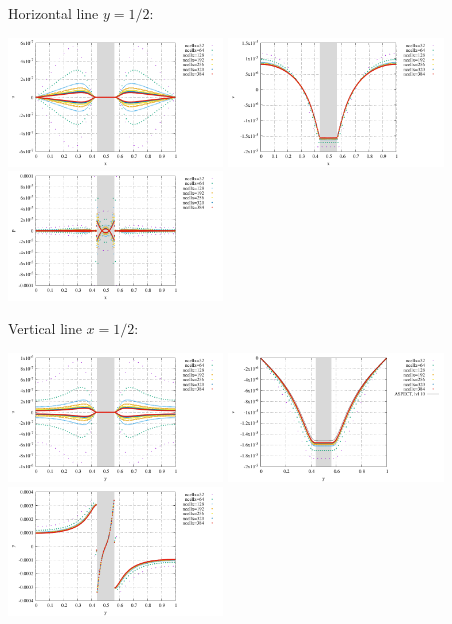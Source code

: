 Horizontal line $y=1/2$:
\begin{center}
\includegraphics[width=5.7cm]{python_codes/fieldstone_158/results/exp5/profilex_u}
\includegraphics[width=5.7cm]{python_codes/fieldstone_158/results/exp5/profilex_v}
\includegraphics[width=5.7cm]{python_codes/fieldstone_158/results/exp5/profilex_p}
\end{center} 

Vertical line $x=1/2$:
\begin{center}
\includegraphics[width=5.7cm]{python_codes/fieldstone_158/results/exp5/profiley_u}
\includegraphics[width=5.7cm]{python_codes/fieldstone_158/results/exp5/profiley_v}
\includegraphics[width=5.7cm]{python_codes/fieldstone_158/results/exp5/profiley_p}
\end{center} 

